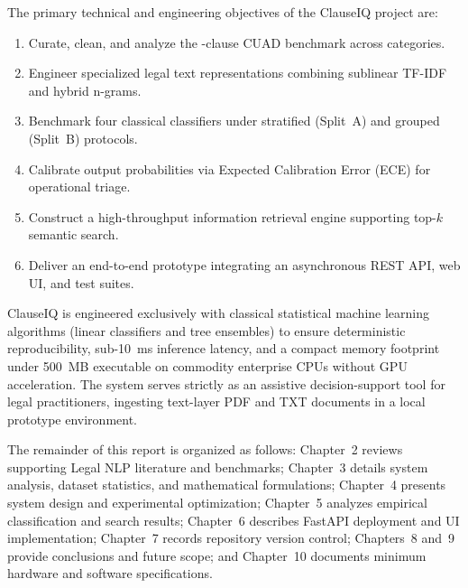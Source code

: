 The primary technical and engineering objectives of the ClauseIQ project are:
\begin{enumerate}\itemsep 1pt \parskip 0pt \parsep 0pt
    \item Curate, clean, and analyze the \TotalClauses{}-clause CUAD benchmark across \NumClasses{} categories.
    \item Engineer specialized legal text representations combining sublinear TF-IDF and hybrid n-grams.
    \item Benchmark four classical classifiers under stratified (Split~A) and grouped (Split~B) protocols.
    \item Calibrate output probabilities via Expected Calibration Error (ECE) for operational triage.
    \item Construct a high-throughput information retrieval engine supporting top-$k$ semantic search.
    \item Deliver an end-to-end prototype integrating an asynchronous REST API, web UI, and test suites.
\end{enumerate}

ClauseIQ is engineered exclusively with classical statistical machine learning algorithms (linear classifiers and tree ensembles) to ensure deterministic reproducibility, sub-10~ms inference latency, and a compact memory footprint under 500~MB executable on commodity enterprise CPUs without GPU acceleration. The system serves strictly as an assistive decision-support tool for legal practitioners, ingesting text-layer PDF and TXT documents in a local prototype environment.

The remainder of this report is organized as follows: Chapter~2 reviews supporting Legal NLP literature and benchmarks; Chapter~3 details system analysis, dataset statistics, and mathematical formulations; Chapter~4 presents system design and experimental optimization; Chapter~5 analyzes empirical classification and search results; Chapter~6 describes FastAPI deployment and UI implementation; Chapter~7 records repository version control; Chapters~8 and~9 provide conclusions and future scope; and Chapter~10 documents minimum hardware and software specifications.
